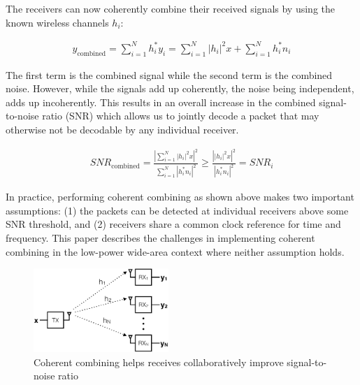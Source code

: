 

The receivers can now coherently combine their received signals by using the
known wireless channels $h_i$:

\begin{align*}
y_{\text{combined}}
	= \sum_{i=1}^N h^*_i y_i
	= \sum_{i=1}^N \left| h_i \right|^2 x + \sum_{i=1}^N h^*_i n_i
\end{align*}

The first term is the combined signal while the second term is the combined
noise. However, while the signals add up coherently, the noise being
independent, adds up incoherently.  This results in an overall increase in the
combined signal-to-noise ratio (SNR) which allows us to jointly decode a
packet that may otherwise not be decodable by any individual receiver.

\begin{align*}
SNR_{\text{combined}} %
	= \frac{\left| \sum_{i=1}^N \left| h_i \right|^2 x \right|^2}{\sum_{i=1}^N \left| h^*_i n_i \right|^2} 
	\geq \frac{\left| \left| h_i \right|^2 x \right|^2}{\left| h^*_i n_i \right|^2} = SNR_i
\end{align*}

In practice, performing coherent combining as shown above makes two important
assumptions: (1) the packets can be detected at individual receivers above
some SNR threshold, and (2) receivers share a common clock reference for time
and frequency. This paper describes the challenges in implementing coherent
combining in the low-power wide-area context where neither assumption holds.

\begin{figure}[htb]
    \centering
    \includegraphics[height=1.25in]{figures/SIMO_cropped}
    \caption{Coherent combining helps receives collaboratively improve signal-to-noise ratio}
    \label{fig:simo}
    \compactimg
\end{figure}

